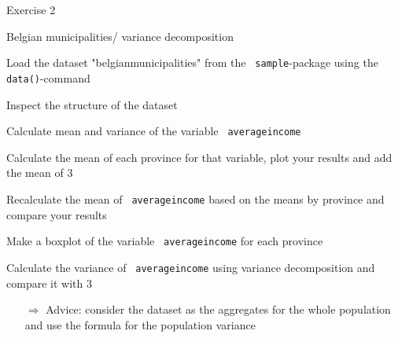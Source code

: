 \documentclass[11pt,german,hideothersubsections]{beamer}
\newcommand{\R}[1]{{\tt \color{blue}  #1}}
\begin{document}
\begin{frame}[fragile]{Exercise 2}
\begin{exampleblock}{Belgian municipalities/ variance decomposition}
\begin{enumerate}\footnotesize{
\item Load the dataset "belgianmunicipalities" from the \R{sample}-package using the \R{data()}-command 
\item Inspect the structure of the dataset
\item Calculate mean and variance of the variable \R{averageincome} 
\item Calculate the mean of each province for that variable, plot your results and add the mean of \alert{3} 
\item Recalculate the mean of \R{averageincome} based on the means by province and compare your results
\item Make a boxplot of the variable \R{averageincome} for each province
\item Calculate the variance of \R{averageincome} using variance decomposition and compare it with \alert{3}
\begin{itemize}
\item[$\Rightarrow$]\footnotesize{ Advice: consider the dataset as the aggregates for the whole population and use the formula for the population variance}
\end{itemize}
}
\end{enumerate}
\end{exampleblock}

\end{frame}
\end{document}
